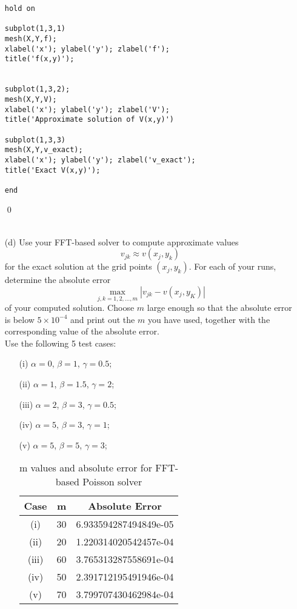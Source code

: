 \documentclass[12pt]{article}
\begin{document}
\begin{itemize}
\begin{lstlisting}[caption= Function To Approximate \text{$V(x,y)$} with Given BCs]
hold on

subplot(1,3,1)
mesh(X,Y,f);
xlabel('x'); ylabel('y'); zlabel('f');
title('f(x,y)');


subplot(1,3,2);
mesh(X,Y,V);
xlabel('x'); ylabel('y'); zlabel('V');
title('Approximate solution of V(x,y)')

subplot(1,3,3)
mesh(X,Y,v_exact);
xlabel('x'); ylabel('y'); zlabel('v_exact');
title('Exact V(x,y)');

end
\end{lstlisting}
\qed\\\\


\item[(d)]  Use your FFT-based solver to compute approximate values
$$v_{jk} \approx v(x_j, y_k)$$
for the exact solution at the grid points $(x_j,y_k)$.  For each of your runs, determine the absolute error
$$\max_{j,k=1,2,\dots,m}|v_{jk} - v(x_j,y_K)|$$
of your computed solution.  Choose $m$ large enough so that the absolute error is below $5\times 10^{-4}$ and print out the $m$ you have used, together with the corresponding value of the absolute error.\\
Use the following 5 test cases:
\begin{itemize}
\item[(i)] $\alpha = 0$, $\beta = 1$, $\gamma = 0.5$;

\item[(ii)] $\alpha = 1$, $\beta = 1.5$, $\gamma = 2$;

\item[(iii)] $\alpha = 2$, $\beta = 3$, $\gamma = 0.5$;

\item[(iv)] $\alpha = 5$, $\beta = 3$, $\gamma = 1$;

\item[(v)] $\alpha = 5$, $\beta = 5$, $\gamma = 3$;

\begin{table}[H]
\centering
\renewcommand{\arraystretch}{1.3}
\begin{tabular}{| c || c | c |}
\hline
Case & m & Absolute Error\\
\hline 
(i) &  30 &  6.933594287494849e-05 \\
(ii) &  20 & 1.220314020542457e-04  \\
(iii) &  60 &  3.765313287558691e-04 \\
(iv) & 50  &  2.391712195491946e-04 \\
(v) & 70  & 3.799707430462984e-04  \\
\hline
\end{tabular}
\caption{m values and absolute error for FFT-based Poisson solver}
\end{table} 


\end{itemize}
\end{itemize}
\end{document}
